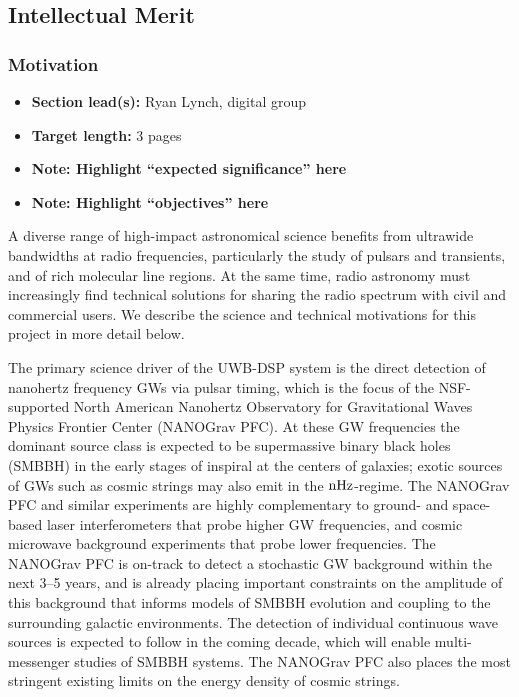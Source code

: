 \documentclass[10pt]{myNSF}
\begin{document}
\subsection{Intellectual Merit}
\label{sec:IM}

\subsubsection{Motivation}
\label{sec:motivation}

\begin{itemize}
\item{\textbf{Section lead(s):} Ryan Lynch, digital group}
\item{\textbf{Target length:} 3 pages}
\item{\textbf{Note: Highlight ``expected significance'' here}}
\item{\textbf{Note: Highlight ``objectives'' here}}
\end{itemize}

A diverse range of high-impact astronomical science benefits from
ultrawide bandwidths at radio frequencies, particularly the study of
pulsars and transients, and of rich molecular line regions.  At the
same time, radio astronomy must increasingly find technical solutions
for sharing the radio spectrum with civil and commercial users.  We
describe the science and technical motivations for this project in
more detail below.

\label{sec:science_motivation}

 The primary science driver
of the UWB-DSP system is the direct detection of nanohertz frequency
GWs via pulsar timing, which is the focus of the NSF-supported North
American Nanohertz Observatory for Gravitational Waves Physics
Frontier Center (NANOGrav PFC).  At these GW frequencies the dominant
source class is expected to be supermassive binary black holes (SMBBH)
in the early stages of inspiral at the centers of galaxies; exotic
sources of GWs such as cosmic strings may also emit in the
$\textrm{nHz}$-regime.  The NANOGrav PFC and similar experiments are highly
complementary to ground- and space-based laser interferometers that
probe higher GW frequencies, and cosmic microwave background
experiments that probe lower frequencies.  The NANOGrav PFC is
on-track to detect a stochastic GW background within the next 3--5
years, and is already placing important constraints on the amplitude
of this background that informs models of SMBBH evolution and coupling
to the surrounding galactic environments.  The detection of individual
continuous wave sources is expected to follow in the coming decade,
which will enable multi-messenger studies of SMBBH systems.  The
NANOGrav PFC also places the most stringent existing limits on the
energy density of cosmic strings.
\end{document}
